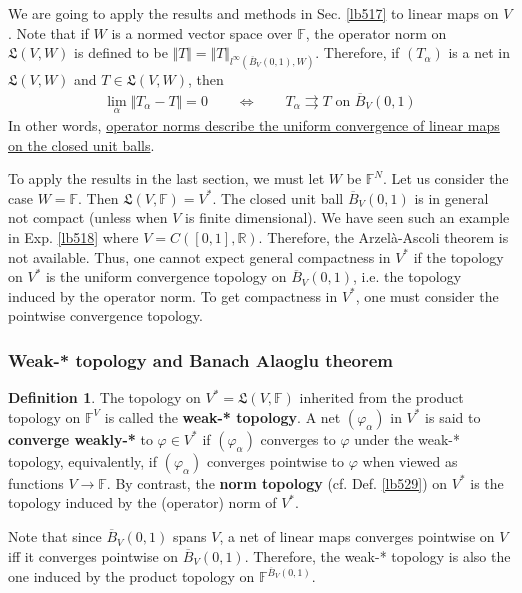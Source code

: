 \documentclass[12pt,b5paper,notitlepage]{article}
\theoremstyle{definition}
\newtheorem{df}{Definition}[section]
\theoremstyle{plain}
\newcommand{\fk}{\mathfrak}
\newcommand{\ovl}{\overline}
\newcommand{\Rbb}{\mathbb R}
\newcommand{\Fbb}{\mathbb F}
\numberwithin{equation}{section}
\begin{document}
We are going to apply the results and methods in Sec. \ref{lb517} to linear maps on $V$. Note that if $W$ is a normed vector space over $\Fbb$, the operator norm on $\fk L(V,W)$ is defined to be $\Vert T\Vert=\Vert T\Vert_{l^\infty(\ovl B_V(0,1),W)}$. Therefore, if $(T_\alpha)$ is a net in $\fk L(V,W)$ and $T\in\fk L(V,W)$, then
\begin{align}
\lim_\alpha \Vert T_\alpha-T\Vert=0\qquad\Longleftrightarrow\qquad T_\alpha\rightrightarrows T\text{ on }\ovl B_V(0,1) 
\end{align}
In other words, \uline{operator norms describe the uniform convergence of linear maps on the closed unit balls}.

To apply the results in the last section, we must let $W$ be $\Fbb^N$. Let us consider the case $W=\Fbb$. Then $\fk L(V,\Fbb)=V^*$. The closed unit ball $\ovl B_V(0,1)$ is in general not compact (unless when $V$ is finite dimensional). We have seen such an example in Exp. \ref{lb518} where $V=C([0,1],\Rbb)$. Therefore, the Arzel\`a-Ascoli theorem is not available. Thus, one cannot expect general compactness in $V^*$ if the topology on $V^*$ is the uniform  convergence topology on $\ovl B_V(0,1)$, i.e. the topology induced by the operator norm. To get compactness in $V^*$, one must consider the pointwise convergence topology.



\subsubsection{Weak-* topology and Banach Alaoglu theorem}


\begin{df}
The topology on $V^*=\fk L(V,\Fbb)$ inherited from the product topology on $\Fbb^V$ is called the \textbf{weak-* topology}.  A net $(\varphi_\alpha)$ in $V^*$ is said to \textbf{converge weakly-*} to $\varphi\in V^*$ if $(\varphi_\alpha)$ converges to $\varphi$ under the weak-* topology, equivalently, if $(\varphi_\alpha)$ converges pointwise to $\varphi$ when viewed as functions $V\rightarrow\Fbb$. By contrast, the \textbf{norm topology}  (cf. Def. \ref{lb529}) on $V^*$ is the topology induced by the (operator) norm of $V^*$.
\end{df}

Note that since $\ovl B_V(0,1)$ spans $V$, a net of linear maps converges pointwise on $V$ iff it converges pointwise on $\ovl B_V(0,1)$. Therefore, the weak-* topology is also the one induced by the product topology on $\Fbb^{\ovl B_V(0,1)}$.
\end{document}
